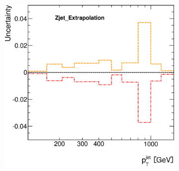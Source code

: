 \documentclass[12pt, twoside]{article}
\numberwithin{equation}{section}
\numberwithin{figure}{section}
\newenvironment{changemargin}[2]{%
\begin{list}{}{%
\setlength{\topsep}{0pt}%
\setlength{\leftmargin}{#1}%
\setlength{\rightmargin}{#2}%
\setlength{\listparindent}{\parindent}%
\setlength{\itemindent}{\parindent}%
\setlength{\parsep}{\parskip}%
}%
\item[]}{\end{list}}
\begin{document}
\begin{figure}[H]
\begin{changemargin}{-1.0cm}{-0.75cm}
\begin{changemargin}{-0.75cm}{-1.0cm}
\begin{subfigure}[b]{0.25\textwidth}
        \end{subfigure}
        \begin{subfigure}[b]{0.25\textwidth}
            \includegraphics[width=\textwidth]{./images/JetSystematics/JetSystematic-44.eps}
        \end{subfigure}


\end{changemargin}
\end{changemargin}
\end{figure}
\end{document}
